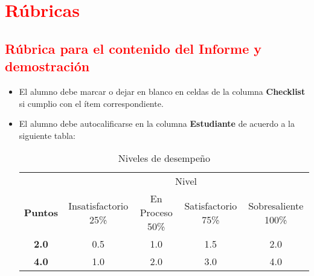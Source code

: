 	\clearpage
 	\section{\textcolor{red}{Rúbricas}}
	\subsection{\textcolor{red}{Rúbrica para el contenido del Informe y demostración}}
	\begin{itemize}			
		\item El alumno debe marcar o dejar en blanco en celdas de la columna \textbf{Checklist} si cumplio con el ítem correspondiente.
		\item El alumno debe autocalificarse en la columna \textbf{Estudiante} de acuerdo a la siguiente tabla:
	
		\begin{table}[ht]
			\caption{Niveles de desempeño}
			\begin{center}
			\begin{tabular}{ccccc}
    			\hline
    			 & \multicolumn{4}{c}{Nivel}\\
    			\cline{1-5}
    			\textbf{Puntos} & Insatisfactorio 25\%& En Proceso 50\% & Satisfactorio 75\% & Sobresaliente 100\%\\
    			\textbf{2.0}&0.5&1.0&1.5&2.0\\
    			\textbf{4.0}&1.0&2.0&3.0&4.0\\
    		\hline
			\end{tabular}
		\end{center}
	\end{table}	
	
	\end{itemize}
	
